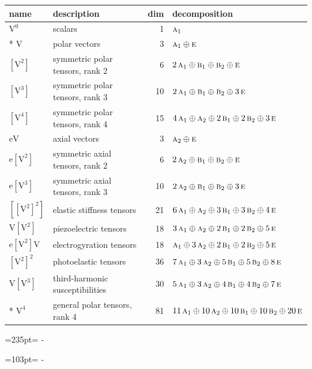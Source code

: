 \documentclass[10pt,a4paper]{article}
\newcommand{\needspace}[1]{\par\penalty-100\begingroup\dimen0=#1\relax\dimen2=\pagegoal
  \advance\dimen2-\pagetotal\ifdim\dimen0>\dimen2\relax\ifdim\dimen2>0pt\vfil\break\fi\fi
  \endgroup}
\numberwithin{equation}{section}
\newcommand{\irr}[1]{\text{\normalfont\scshape #1}}
\newcommand{\jahn}[1]{\mathrm{#1}}
\newlength{\fillwidth}\newlength{\cellwidth}\newlength{\colwidth}
\begin{document}
{\begin{longtable}{@{}llr>{\RaggedRight\arraybackslash}p{\fillwidth}@{}}
name & description & dim & decomposition\\\midrule\endhead
\bottomrule\endfoot\endlastfoot
$\jahn{V^{0}}$ & scalars & 1 & $\irr{a}_{1}$\\*
$\jahn{V}$ & polar vectors & 3 & $\irr{a}_{1} \oplus\allowbreak \irr{e}$\\
$\jahn{[V^{2}]}$ & symmetric polar tensors, rank 2 & 6 & $2\,\irr{a}_{1} \oplus\allowbreak \irr{b}_{1} \oplus\allowbreak \irr{b}_{2} \oplus\allowbreak \irr{e}$\\
$\jahn{[V^{3}]}$ & symmetric polar tensors, rank 3 & 10 & $2\,\irr{a}_{1} \oplus\allowbreak \irr{b}_{1} \oplus\allowbreak \irr{b}_{2} \oplus\allowbreak 3\,\irr{e}$\\
$\jahn{[V^{4}]}$ & symmetric polar tensors, rank 4 & 15 & $4\,\irr{a}_{1} \oplus\allowbreak \irr{a}_{2} \oplus\allowbreak 2\,\irr{b}_{1} \oplus\allowbreak 2\,\irr{b}_{2} \oplus\allowbreak 3\,\irr{e}$\\
$\jahn{eV}$ & axial vectors & 3 & $\irr{a}_{2} \oplus\allowbreak \irr{e}$\\
$\jahn{e[V^{2}]}$ & symmetric axial tensors, rank 2 & 6 & $2\,\irr{a}_{2} \oplus\allowbreak \irr{b}_{1} \oplus\allowbreak \irr{b}_{2} \oplus\allowbreak \irr{e}$\\
$\jahn{e[V^{3}]}$ & symmetric axial tensors, rank 3 & 10 & $2\,\irr{a}_{2} \oplus\allowbreak \irr{b}_{1} \oplus\allowbreak \irr{b}_{2} \oplus\allowbreak 3\,\irr{e}$\\
$\jahn{[[V^{2}]^{2}]}$ & elastic stiffness tensors & 21 & $6\,\irr{a}_{1} \oplus\allowbreak \irr{a}_{2} \oplus\allowbreak 3\,\irr{b}_{1} \oplus\allowbreak 3\,\irr{b}_{2} \oplus\allowbreak 4\,\irr{e}$\\
$\jahn{V[V^{2}]}$ & piezoelectric tensors & 18 & $3\,\irr{a}_{1} \oplus\allowbreak \irr{a}_{2} \oplus\allowbreak 2\,\irr{b}_{1} \oplus\allowbreak 2\,\irr{b}_{2} \oplus\allowbreak 5\,\irr{e}$\\
$\jahn{e[V^{2}]V}$ & electrogyration tensors & 18 & $\irr{a}_{1} \oplus\allowbreak 3\,\irr{a}_{2} \oplus\allowbreak 2\,\irr{b}_{1} \oplus\allowbreak 2\,\irr{b}_{2} \oplus\allowbreak 5\,\irr{e}$\\
$\jahn{[V^{2}]^{2}}$ & photoelastic tensors & 36 & $7\,\irr{a}_{1} \oplus\allowbreak 3\,\irr{a}_{2} \oplus\allowbreak 5\,\irr{b}_{1} \oplus\allowbreak 5\,\irr{b}_{2} \oplus\allowbreak 8\,\irr{e}$\\
$\jahn{V[V^{3}]}$ & third-harmonic susceptibilities & 30 & $5\,\irr{a}_{1} \oplus\allowbreak 3\,\irr{a}_{2} \oplus\allowbreak 4\,\irr{b}_{1} \oplus\allowbreak 4\,\irr{b}_{2} \oplus\allowbreak 7\,\irr{e}$\\*
$\jahn{V^{4}}$ & general polar tensors, rank 4 & 81 & $11\,\irr{a}_{1} \oplus\allowbreak 10\,\irr{a}_{2} \oplus\allowbreak 10\,\irr{b}_{1} \oplus\allowbreak 10\,\irr{b}_{2} \oplus\allowbreak 20\,\irr{e}$\\
\bottomrule\end{longtable}}
\needspace{235pt}
\needspace{103pt}
\end{document}
